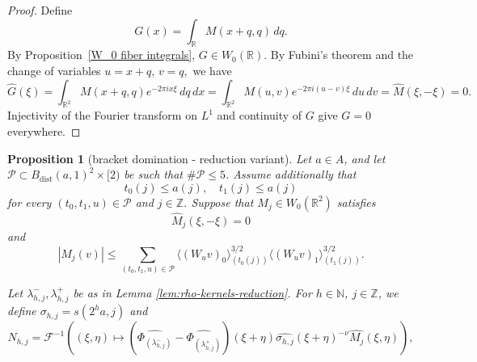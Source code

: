 \documentclass[12pt,reqno]{amsart}
\theoremstyle{plain}
\newtheorem{proposition}[theorem]{Proposition}
\numberwithin{equation}{section}
\theoremstyle{remark}
\newcommand{\uses}[1]{}
\newcommand{\usesdefs}[1]{}
\newcommand{\Z}{{\mathbb Z}}
\newcommand{\N}{{\mathbb N}}
\DeclareMathOperator{\dist}{dist}
\begin{document}
\begin{proof}
    Define
\[
G(x)=\int_{\mathbb R}M(x+q,q)\,dq.
\]
By Proposition~\ref{W_0 fiber integrals}, \(G\in W_0(\mathbb R)\).
By Fubini's theorem and the change of variables
$ u=x+q, \, v=q, $
we have
\[
\widehat G(\xi)
=
\int_{\mathbb R^2}
M(x+q,q)e^{-2\pi ix\xi}\,dq\,dx
=
\int_{\mathbb R^2}
M(u,v)e^{-2\pi i(u-v)\xi}\,du\,dv=
\widehat M(\xi,-\xi)
=
0.
\]
Injectivity of the Fourier transform on \(L^1\) and continuity of $G$ give
\(G=0\) everywhere.
\end{proof}


\begin{proposition}[bracket domination - reduction variant]
\label{lem:increase-data-bracket-domination}\uses{lem:rho-kernels-reduction,two bump estimate,bump triangle,orthogonal decay,convolution vector,lem:affine-diagonal-cancellation-reduction,Properties of distance of sequences,Operations on spaced sequences}\usesdefs{gaussian,bracket bump,auto:Wiener-space-definition,auto:convolution-along-vector-definition,multiplicatively spaced monotone sequences,Distance of spaced sequences,closed balls in A,standard bump,geometric parameters,auto:unitary-matrices-definition,square root Gaussian difference}
Let \(a\in A\), and let
$
\mathcal P\subset B_{\dist}(a,1)^2\times[2)$ be such that $\#\mathcal P\leq5$. Assume additionally that
\begin{equation}
    \label{E:increase-data-one-sided-scales}
    t_0(j)\leq a(j),
    \quad
    t_1(j)\leq a(j)
\end{equation}
for every \((t_0,t_1,u)\in\mathcal P\) and \(j\in\mathbb Z\).
Suppose that \(M_j\in W_0(\mathbb R^2)\) satisfies
\begin{equation}\label{auto:reduction-diagonal-cancellation}
\widehat M_j(\xi,-\xi)=0
\end{equation}
and
\begin{equation}\label{auto:reduction-kernel-decay}
|M_j(v)|
\leq
\sum_{(t_0,t_1,u)\in\mathcal P}
\langle(W_uv)_0\rangle_{(t_0(j))}^{3/2}
\langle(W_uv)_1\rangle_{(t_1(j))}^{3/2}.
\end{equation}

Let $\lambda_{h,j}^-,\lambda_{h,j}^+$ be as in Lemma \ref{lem:rho-kernels-reduction}.
For $h\in\N$, $j\in \Z$, we define
$
\sigma_{h,j} = s(2^{h} a,j)
$
and
\begin{equation}\label{auto:increase-data-N-kernel}
N_{h,j} =
\mathcal F^{-1}\left((\xi,\eta) \mapsto (\widehat{\Phi_{(\lambda_{h,j}^-)}}-\widehat{\Phi_{(\lambda_{h,j}^+)}})(\xi+\eta) \widehat{\sigma_{h,j}}(\xi+\eta)^{-\nu} \widehat{M_j}(\xi,\eta)\right),
\end{equation}



\end{proposition}
\end{document}
